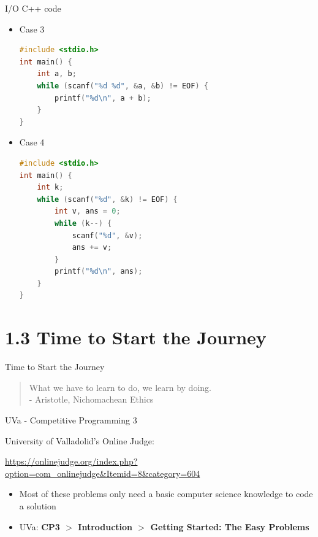 \documentclass{beamer}
\begin{document}
\begin{frame}[fragile]{I/O C++ code}
    \begin{itemize}
        \item Case 3
\begin{lstlisting}[language=c++]
#include <stdio.h>
int main() {
	int a, b;
	while (scanf("%d %d", &a, &b) != EOF) {
		printf("%d\n", a + b);
	}
}
\end{lstlisting}
        \item Case 4
\begin{lstlisting}[language=c++]
#include <stdio.h>
int main() {
	int k;
	while (scanf("%d", &k) != EOF) {
		int v, ans = 0;
		while (k--) {
			scanf("%d", &v);
			ans += v;
		}
		printf("%d\n", ans);
	}
}
\end{lstlisting}
    \end{itemize}
\end{frame}

\section{1.3 Time to Start the Journey}

\begin{frame}{Time to Start the Journey}
    \begin{quote}
        What we have to learn to do, we learn by doing. 
        \vspace{0.3cm} \\
        
          - Aristotle, Nichomachean Ethics
    \end{quote}
\end{frame}

\begin{frame}{UVa - Competitive Programming 3}
    
    University of Valladolid's Online Judge: 
    
    \url{https://onlinejudge.org/index.php?option=com_onlinejudge&Itemid=8&category=604}
    
    \begin{itemize}
        \item Most of these problems only need a basic computer science knowledge to code a solution
        \item UVa: \textbf{CP3 $>$ Introduction $>$ Getting Started: The Easy Problems}
    \end{itemize}
\end{frame}
\end{document}
